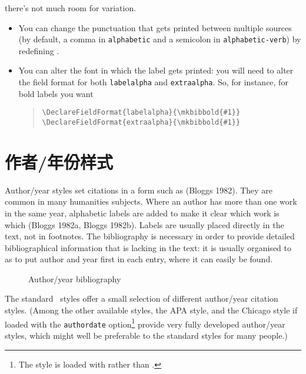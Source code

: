  there's not much room for
variation.
\begin{itemize}
\item You can change the punctuation that gets printed between
  multiple sources (by default, a comma in \verb|alphabetic| and a
  semicolon in \verb|alphabetic-verb|) by redefining
  .
\item You can alter the font in which the label gets printed: you will
  need to alter the field format for both \verb|labelalpha| and
  \verb|extraalpha|. So, for instance, for bold labels you want
\begin{quote}
\verb|\DeclareFieldFormat{labelalpha}{\mkbibbold{#1}}|\\
\verb|\DeclareFieldFormat{extraalpha}{\mkbibbold{#1}}|
\end{quote}
\end{itemize}

\section{作者/年份样式}

Author/year styles set citations in a form such as (Bloggs 1982). They
are common in many humanities subjects. Where an author has more
than one work in the same year, alphabetic labels are added to make it
clear which work is which (Bloggs 1982a, Bloggs 1982b). Labels are
usually placed directly in the text, not in footnotes. The
bibliography is necessary in order to provide detailed
bibliographical information that is lacking in the text: it is usually
organised to as to put author and year first in each entry, where it
can easily be found.

\begin{figure}
\caption{Author/year bibliography\label{example:bibliography:authoryear}}
\end{figure}

 The standard
\biblatex\ styles offer a small selection of different author/year
citation styles. (Among the other available styles, the APA style, and
the Chicago style if loaded with the \verb|authordate|
option\footnote{The  style is loaded with
   rather than
  .} provide very fully
developed author/year styles, which might well be preferable to the
standard styles for many people.)

